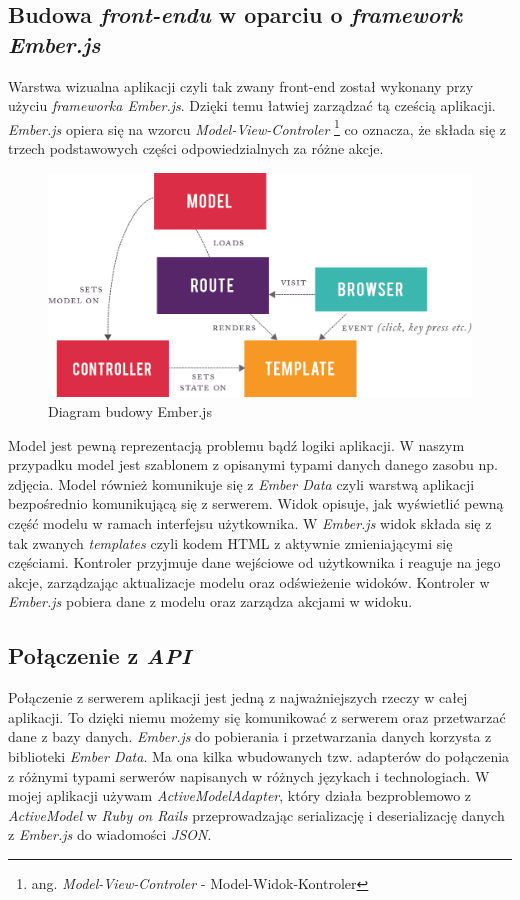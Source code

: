 \documentclass[openright]{xmgr}
\begin{document}
\subsection{Budowa \textit{front-endu} w oparciu o \textit{framework Ember.js} }
Warstwa wizualna aplikacji czyli tak zwany front-end został wykonany przy użyciu \textit{frameworka Ember.js}. Dzięki temu łatwiej zarządzać tą cześcią aplikacji. \textit{Ember.js} opiera się na wzorcu \textit{Model-View-Controler} \footnote{ang. \textit{Model-View-Controler} -  Model-Widok-Kontroler} co oznacza, że składa się z trzech podstawowych części odpowiedzialnych za różne akcje. 
\begin{figure}[H]
\centering
\includegraphics[width=0.7\hsize]{images/ember.png}
\caption{Diagram budowy Ember.js\label{RYS.1}}
\end{figure}
Model  jest pewną reprezentacją problemu bądź logiki aplikacji. W naszym przypadku model jest szablonem z opisanymi typami danych danego zasobu np. zdjęcia. Model również komunikuje się z \textit{Ember Data} czyli warstwą aplikacji bezpośrednio komunikującą się z serwerem.  Widok opisuje, jak wyświetlić pewną część modelu w ramach interfejsu użytkownika. W \textit{Ember.js} widok składa się z tak zwanych \textit{templates} czyli kodem HTML z aktywnie zmieniającymi się częściami. Kontroler przyjmuje dane wejściowe od użytkownika i reaguje na jego akcje, zarządzając aktualizacje modelu oraz odświeżenie widoków. Kontroler w \textit{Ember.js} pobiera dane z modelu oraz zarządza akcjami w widoku.

\subsection{Połączenie z \textit{API}}
Połączenie z serwerem aplikacji jest jedną z najważniejszych rzeczy w całej aplikacji. To dzięki niemu możemy się komunikować z serwerem oraz przetwarzać dane z bazy danych. \textit{Ember.js} do pobierania i przetwarzania danych korzysta z biblioteki \textit{Ember Data}. Ma ona kilka wbudowanych tzw. adapterów do połączenia z różnymi typami serwerów napisanych w różnych językach i technologiach. W mojej aplikacji używam \textit{ActiveModelAdapter}, który działa bezproblemowo z \textit{ActiveModel} w \textit{Ruby on Rails} przeprowadzając serializację i deserializację danych z \textit{Ember.js} do wiadomości \textit{JSON}.
\end{document}
